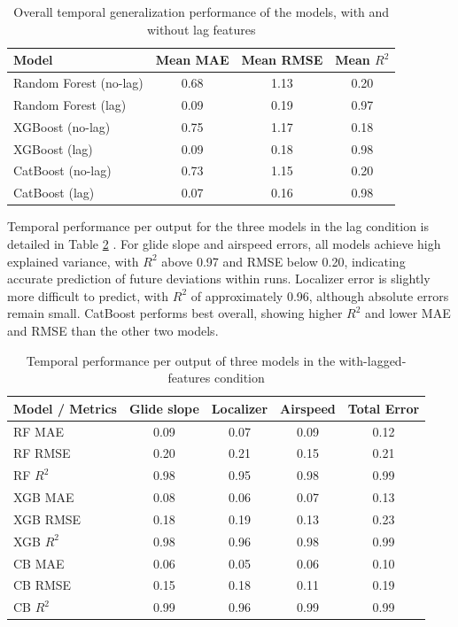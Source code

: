 \documentclass[11pt, a4paper]{article}
\begin{document}
\begin{table}[htbp]
	\caption{Overall temporal generalization performance of the models, with and without lag features}
	\label{tab:overll-temp}
	\centering
	\small
	\begin{tabular}{lccc}
		\toprule                                 	
		Model          	&  Mean MAE      &  Mean RMSE      & Mean $R^2$ \\ 
		\midrule
		Random Forest (no-lag)  	& 0.68  	& 1.13  & 0.20 \\
		Random Forest (lag)         & 0.09 	& 0.19 & 0.97 \\
		\midrule
		XGBoost (no-lag)  	& 0.75  	& 1.17  & 0.18\\
		XGBoost (lag)         & 0.09	& 0.18 & 0.98 \\
		\midrule
		CatBoost (no-lag)  	& 0.73  	& 1.15 & 0.20 \\
		CatBoost (lag)         & 0.07 	& 0.16 & 0.98\\ 
		\bottomrule
	\end{tabular}
\end{table}

Temporal performance per output for the three models in the lag condition is detailed in Table \ref{tab:temp-per-output} . For glide slope and airspeed errors, all models achieve high explained variance, with $R^2$ above 0.97 and RMSE below 0.20, indicating accurate prediction of future deviations within runs. Localizer error is slightly more difficult to predict, with $R^2$ of approximately 0.96, although absolute errors remain small. CatBoost performs best overall, showing higher $R^2$ and lower MAE and RMSE than the other two models.

\begin{table}[htbp]
	\caption{Temporal performance per output of three models in the with-lagged-features condition}
	\label{tab:temp-per-output}
	\centering
	\small
	\begin{tabular}{lcccc}
		\toprule
		Model / Metrics  & Glide slope & Localizer & Airspeed & Total Error \\
		\midrule
		RF MAE           & 0.09 & 0.07 & 0.09 & 0.12 \\
		RF RMSE          & 0.20 & 0.21 & 0.15 & 0.21 \\
		RF $R^2$         & 0.98 & 0.95 & 0.98 & 0.99 \\
		\midrule
		XGB MAE          & 0.08 & 0.06 & 0.07 & 0.13 \\
		XGB RMSE         & 0.18 & 0.19 & 0.13 & 0.23 \\
		XGB $R^2$        & 0.98 & 0.96 & 0.98 & 0.99 \\
		\midrule
		CB MAE          & 0.06 & 0.05 & 0.06 & 0.10 \\
		CB RMSE         & 0.15 & 0.18 & 0.11 & 0.19 \\
		CB $R^2$        & 0.99 & 0.96 & 0.99 & 0.99 \\
		\bottomrule
	\end{tabular}
\end{table}
\end{document}

